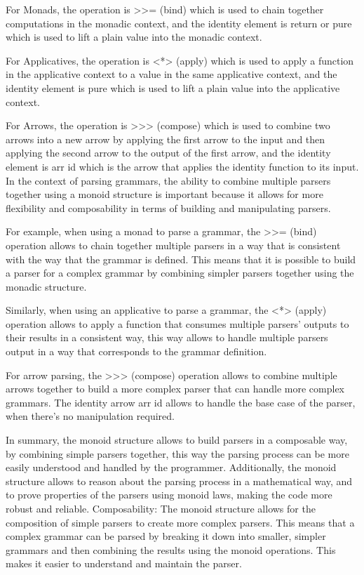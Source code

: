 \documentclass[12pt,twoside]{report}
\begin{document}
For Monads, the operation is >>= (bind) which is used to chain together computations in the monadic context, and the identity element is return or pure which is used to lift a plain value into the monadic context.

For Applicatives, the operation is <*> (apply) which is used to apply a function in the applicative context to a value in the same applicative context, and the identity element is pure which is used to lift a plain value into the applicative context.

For Arrows, the operation is >>> (compose) which is used to combine two arrows into a new arrow by applying the first arrow to the input and then applying the second arrow to the output of the first arrow, and the identity element is arr id which is the arrow that applies the identity function to its input.
In the context of parsing grammars, the ability to combine multiple parsers together using a monoid structure is important because it allows for more flexibility and composability in terms of building and manipulating parsers.

For example, when using a monad to parse a grammar, the >>= (bind) operation allows to chain together multiple parsers in a way that is consistent with the way that the grammar is defined. This means that it is possible to build a parser for a complex grammar by combining simpler parsers together using the monadic structure.

Similarly, when using an applicative to parse a grammar, the <*> (apply) operation allows to apply a function that consumes multiple parsers' outputs to their results in a consistent way, this way allows to handle multiple parsers output in a way that corresponds to the grammar definition.

For arrow parsing, the >>> (compose) operation allows to combine multiple arrows together to build a more complex parser that can handle more complex grammars. The identity arrow arr id allows to handle the base case of the parser, when there's no manipulation required.

In summary, the monoid structure allows to build parsers in a composable way, by combining simple parsers together, this way the parsing process can be more easily understood and handled by the programmer. Additionally, the monoid structure allows to reason about the parsing process in a mathematical way, and to prove properties of the parsers using monoid laws, making the code more robust and reliable.
Composability: The monoid structure allows for the composition of simple parsers to create more complex parsers. This means that a complex grammar can be parsed by breaking it down into smaller, simpler grammars and then combining the results using the monoid operations. This makes it easier to understand and maintain the parser.
\end{document}
